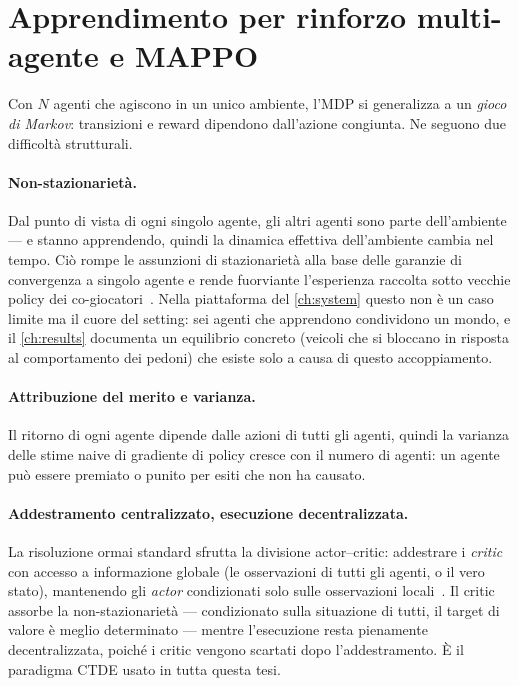 \section{Apprendimento per rinforzo multi-agente e MAPPO}
\label{sec:marl}

Con $N$ agenti che agiscono in un unico ambiente, l'MDP si generalizza a
un \emph{gioco di Markov}: transizioni e reward dipendono dall'azione
congiunta. Ne seguono due difficoltà strutturali.

\paragraph{Non-stazionarietà.}
Dal punto di vista di ogni singolo agente, gli altri agenti sono parte
dell'ambiente --- e stanno apprendendo, quindi la dinamica effettiva
dell'ambiente cambia nel tempo. Ciò rompe le assunzioni di
stazionarietà alla base delle garanzie di convergenza a singolo agente
e rende fuorviante l'esperienza raccolta sotto vecchie policy dei
co-giocatori~\cite{lowe2017maddpg}. Nella piattaforma del
\cref{ch:system} questo non è un caso limite ma il cuore del setting:
sei agenti che apprendono condividono un mondo, e il \cref{ch:results}
documenta un equilibrio concreto (veicoli che si bloccano in risposta al
comportamento dei pedoni) che esiste solo a causa di questo
accoppiamento.

\paragraph{Attribuzione del merito e varianza.}
Il ritorno di ogni agente dipende dalle azioni di tutti gli agenti,
quindi la varianza delle stime naive di gradiente di policy cresce con
il numero di agenti: un agente può essere premiato o punito per esiti
che non ha causato.

\paragraph{Addestramento centralizzato, esecuzione decentralizzata.}
La risoluzione ormai standard sfrutta la divisione actor--critic:
addestrare i \emph{critic} con accesso a informazione globale (le
osservazioni di tutti gli agenti, o il vero stato), mantenendo gli
\emph{actor} condizionati solo sulle osservazioni
locali~\cite{lowe2017maddpg}. Il critic assorbe la non-stazionarietà ---
condizionato sulla situazione di tutti, il target di valore è meglio
determinato --- mentre l'esecuzione resta pienamente decentralizzata,
poiché i critic vengono scartati dopo l'addestramento. È il paradigma
CTDE usato in tutta questa tesi.

